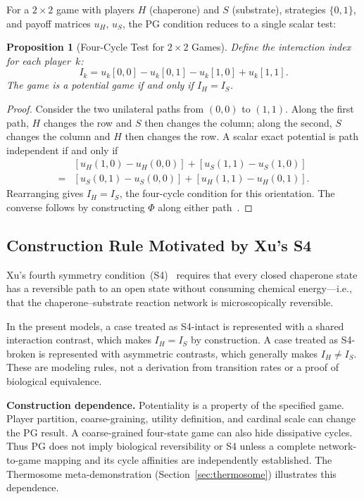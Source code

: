 \documentclass[12pt,a4paper]{article}
\newtheorem{proposition}{Proposition}
\begin{document}
For a $2\times 2$ game with players $H$ (chaperone) and $S$ (substrate),
strategies $\{0, 1\}$, and payoff matrices $u_H$, $u_S$, the PG
condition reduces to a single scalar test:

\begin{proposition}[Four-Cycle Test for $2\times 2$ Games]
\label{prop:four_cycle}
Define the \emph{interaction index} for each player~$k$:
\begin{equation}
  I_k = u_k[0,0] - u_k[0,1] - u_k[1,0] + u_k[1,1].
  \label{eq:interaction}
\end{equation}
The game is a potential game if and only if $I_H = I_S$.
\end{proposition}

\begin{proof}
Consider the two unilateral paths from $(0,0)$ to $(1,1)$. Along the
first path, $H$ changes the row and $S$ then changes the column; along
the second, $S$ changes the column and $H$ then changes the row. A
scalar exact potential is path independent if and only if
\begin{align}
 &[u_H(1,0)-u_H(0,0)]+[u_S(1,1)-u_S(1,0)] \nonumber\\
 ={}&[u_S(0,1)-u_S(0,0)]+[u_H(1,1)-u_H(0,1)].
\end{align}
Rearranging gives $I_H=I_S$, the four-cycle condition for this
orientation. The converse follows by constructing $\Phi$ along either
path~\cite{MondererShapley1996}.
\end{proof}

\subsection{Construction Rule Motivated by Xu's S4}

Xu's fourth symmetry condition~(S4)~\cite{Xu2022} requires that every
closed chaperone state has a reversible path to an open state without
consuming chemical energy---i.e., that the chaperone--substrate
reaction network is microscopically reversible.

In the present models, a case treated as S4-intact is represented with a
shared interaction contrast, which makes $I_H=I_S$ by construction. A
case treated as S4-broken is represented with asymmetric contrasts,
which generally makes $I_H\neq I_S$. These are modeling rules, not a
derivation from transition rates or a proof of biological equivalence.

\textbf{Construction dependence.} Potentiality is a property of the
specified game. Player partition, coarse-graining, utility definition,
and cardinal scale can change the PG result. A coarse-grained four-state
game can also hide dissipative cycles. Thus PG does not imply biological
reversibility or S4 unless a complete network-to-game mapping and its
cycle affinities are independently established. The Thermosome
meta-demonstration (Section~\ref{sec:thermosome}) illustrates this
dependence.
\end{document}

